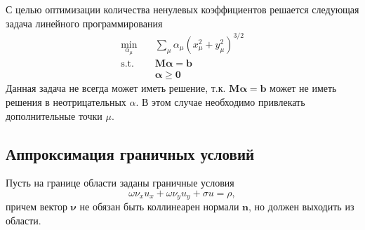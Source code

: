 \documentclass[12pt]{article}
\begin{document}
С целью оптимизации количества ненулевых коэффициентов решается следующая задача линейного программирования
\begin{align*}
\underset{\alpha_\mu}{\operatorname{min}}\quad&\sum_\mu \alpha_\mu (x_\mu^2 + y_\mu^2)^{3/2}\\
\operatorname{s.t.}\quad&\mathbf{M} \boldsymbol{\alpha} = \mathbf{b}\\
&\boldsymbol{\alpha} \geqslant \mathbf{0}
\end{align*}
Данная задача не всегда может иметь решение, т.к. $\mathbf{M} \boldsymbol{\alpha} = \mathbf{b}$ может не иметь решения в неотрицательных $\alpha$. В этом случае необходимо привлекать дополнительные точки $\mu$.

\subsection{Аппроксимация граничных условий}

Пусть на границе области заданы граничные условия
\[
\omega\nu_x u_x + \omega\nu_y u_y + \sigma u = \rho,
\]
причем вектор $\boldsymbol{\nu}$ не обязан быть коллинеарен нормали $\mathbf{n}$, но должен выходить из области.
\end{document}
